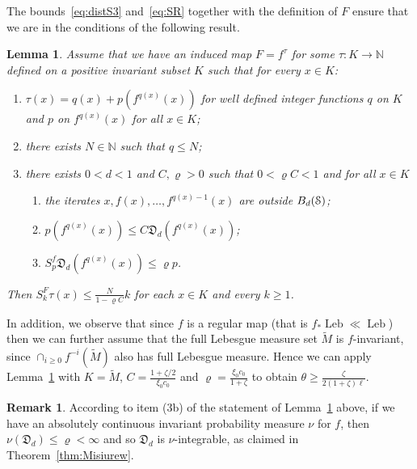 \documentclass[reqno,12pt,a4paper]{amsart}
\theoremstyle{plain}
\newtheorem{lemma}[theorem]{Lemma}
\theoremstyle{definition}
\newtheorem{remark}[theorem]{Remark}
\begin{document}
  The bounds~\eqref{eq:distS3} and~\eqref{eq:SR} together
  with the definition of $F$ ensure that we are in the
  conditions of the following result.

  \begin{lemma}
    \label{le:positive-freq}
    Assume that we have an induced map $F=f^\tau$ for some
    $\tau:K\to{{\mathbb N}}$ defined on a positive invariant subset
    $K$ such that for every $x\in K$:
    \begin{enumerate}
    \item $\tau(x)=q(x)+p(f^{q(x)}(x))$ for well defined
      integer functions $q$ on $K$ and $p$ on $f^{q(x)}(x)$
      for all $x\in K$;
    \item there exists $N\in{{\mathbb N}}$ such that $q\le N$;
    \item there exists $0<d<1$ and $C,{\varrho}>0$ such that
      $0<{\varrho} C<1$ and for all $x\in K$
      \begin{enumerate}
      \item the iterates $x,f(x),\dots,f^{q(x)-1}(x)$ are
        outside $B_{d}({\EuScript{S}})$;
      \item $p(f^{q(x)}(x)) \le C {{\mathfrak D}}_d(f^{q(x)}(x))$;
      \item $S_p^f {{\mathfrak D}}_d(f^{q(x)}(x))\le{\varrho} p$.
      \end{enumerate}
    \end{enumerate}
    Then $S_k^F\tau(x)\le\frac{N}{1-{\varrho} C} k$ for each
    $x\in K$ and every $k\ge1$.
  \end{lemma}

  In addition, we observe that since $f$ is a regular map
  (that is $f_*{\operatorname{Leb}}\ll{\operatorname{Leb}}$) then we can further assume that
  the full Lebesgue measure set $\tilde M$ is $f$-invariant,
  since $\cap_{i\ge0}f^{-i}(\tilde M)$ also has full Lebesgue
  measure. Hence we can apply Lemma~\ref{le:positive-freq}
  with $K=\tilde M$, $C=\frac{1+\zeta/2}{\xi_0 c_0}$
  and ${\varrho}=\frac{\xi_0 c_0}{1+\zeta}$ to obtain
  $\theta\ge\frac{\zeta}{2(1+\zeta)\ell}$.

  \begin{remark}\label{rmk:log-dist-integrable}
    According to item (3b) of the statement of
    Lemma~\ref{le:positive-freq} above, if we have an
    absolutely continuous invariant probability measure
    $\nu$ for $f$, then $\nu({{\mathfrak D}}_d)\le{\varrho}<\infty$ and so
    ${{\mathfrak D}}_d$ is $\nu$-integrable, as claimed in
    Theorem~\ref{thm:Misiurew}.
  \end{remark}
\end{document}
